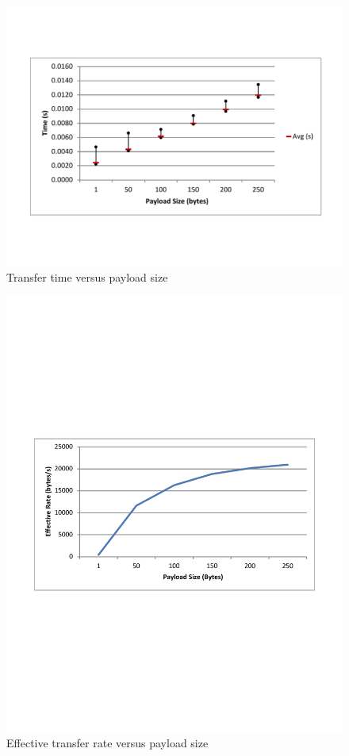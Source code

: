 \begin{figure}[ptb]
	\begin{centering}
		\includegraphics[width=6in]{Protocol/Figures/protocol-time_vs_size.pdf}
		\caption{Transfer time versus payload size}
		\label{fig:protocol:time_vs_size}
	\end{centering}
\end{figure}

\begin{figure}[ptb]
	\begin{centering}
		\includegraphics[width=6in]{Protocol/Figures/protocol-rate_vs_size.pdf}
		\caption{Effective transfer rate versus payload size}
		\label{fig:protocol:rate_vs_size}
	\end{centering}
\end{figure}

